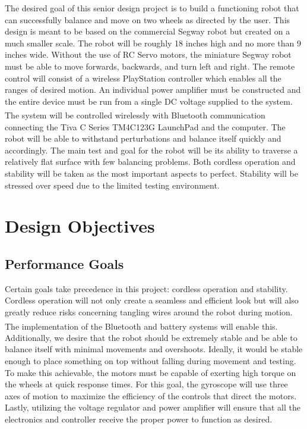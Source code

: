 \documentclass[11pt]{report}
\begin{document}
\begin{spacing}{1.5}
The desired goal of this senior design project is to build a functioning robot that can successfully balance and move on two wheels as directed by the user. This design is meant to be based on the commercial Segway robot but created on a much smaller scale. The robot will be roughly 18 inches high and no more than 9 inches wide. Without the use of RC Servo motors, the miniature Segway robot must be able to move forwards, backwards, and turn left and right. The remote control will consist of a wireless PlayStation controller which enables all the ranges of desired motion. An individual power amplifier must be constructed and the entire device must be run from a single DC voltage supplied to the system. The system will be controlled wirelessly with Bluetooth\textsuperscript{\textregistered} communication connecting the Tiva C Series TM4C123G LaunchPad and the computer. The robot will be able to withstand perturbations and balance itself quickly and accordingly. The main test and goal for the robot will be its ability to traverse a relatively flat surface with few balancing problems. Both cordless operation and stability will be taken as the most important aspects to perfect. Stability will be stressed over speed due to the limited testing environment. 


\section*{Design Objectives} %

\subsection*{Performance Goals}

Certain goals take precedence in this project: cordless operation and stability. Cordless operation will not only create a seamless and efficient look but will also greatly reduce risks concerning tangling wires around the robot during motion. The implementation of the Bluetooth\textsuperscript{\textregistered} and battery systems will enable this. Additionally, we desire that the robot should be extremely stable and be able to balance itself with minimal movements and overshoots. Ideally, it would be stable enough to place something on top without falling during movement and testing. To make this achievable, the motors must be capable of exerting high torque on the wheels at quick response times. For this goal, the gyroscope will use three axes of motion to maximize the efficiency of the controls that direct the motors. Lastly, utilizing the voltage regulator and power amplifier will ensure that all the electronics and controller receive the proper power to function as desired.


\end{spacing}
\end{document}
